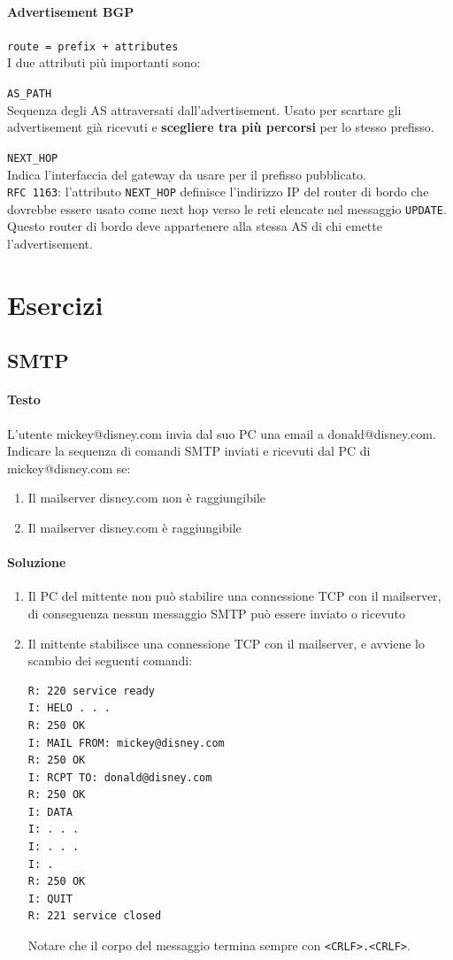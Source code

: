 \documentclass[10pt]{article}
\begin{document}
\paragraph{Advertisement BGP} \texttt{route = prefix + attributes}\\
I due attributi più importanti sono:
\begin{list}{}{}
	\item \texttt{AS\_PATH}\\
	Sequenza degli AS attraversati dall'advertisement. Usato per scartare gli advertisement già ricevuti e \textbf{scegliere tra più percorsi} per lo stesso prefisso.
	\item \texttt{NEXT\_HOP}\\
	Indica l'interfaccia del gateway da usare per il prefisso pubblicato.\\
	\texttt{RFC 1163}: l'attributo \texttt{NEXT\_HOP} definisce l'indirizzo IP del router di bordo che dovrebbe essere usato come next hop verso le reti elencate nel messaggio \texttt{UPDATE}. Questo router di bordo deve appartenere alla stessa AS di chi emette l'advertisement.
\end{list}
\pagebreak
\section{Esercizi}
\subsection{SMTP}
\paragraph{Testo} L’utente mickey@disney.com invia dal suo PC una email a donald@disney.com.\\
Indicare la sequenza di comandi SMTP inviati e ricevuti dal PC di mickey@disney.com se:
\begin{enumerate}
\item Il mailserver disney.com non è raggiungibile
\item Il mailserver disney.com è raggiungibile
\end{enumerate}
\paragraph{Soluzione}
\begin{enumerate}
\item Il PC del mittente non può stabilire una connessione TCP con il mailserver, di conseguenza nessun messaggio SMTP può essere inviato o ricevuto
\item Il mittente stabilisce una connessione TCP con il mailserver, e avviene lo scambio dei seguenti comandi:
\begin{verbatim}
R: 220 service ready
I: HELO . . .
R: 250 OK
I: MAIL FROM: mickey@disney.com
R: 250 OK
I: RCPT TO: donald@disney.com
R: 250 OK
I: DATA
I: . . .
I: . . .
I: .
R: 250 OK
I: QUIT
R: 221 service closed
\end{verbatim}
Notare che il corpo del messaggio termina sempre con \texttt{<CRLF>.<CRLF>}.
\end{enumerate}
\pagebreak
\end{document}
